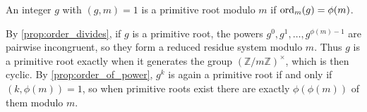 \begin{definition}\label{def:primitive_root}
    An integer $g$ with $(g,m) = 1$ is a primitive root modulo $m$ if $\ord_m(g) = \phi(m)$.
\end{definition}
By \cref{prop:order_divides}, if $g$ is a primitive root, the powers $g^0, g^1, \dots, g^{\phi(m)-1}$ are pairwise incongruent, so they form a reduced residue system modulo $m$. Thus $g$ is a primitive root exactly when it generates the group $(\mathbb{Z}/m\mathbb{Z})^\times$, which is then cyclic. By \cref{prop:order_of_power}, $g^k$ is again a primitive root if and only if $(k, \phi(m)) = 1$, so when primitive roots exist there are exactly $\phi(\phi(m))$ of them modulo $m$.
